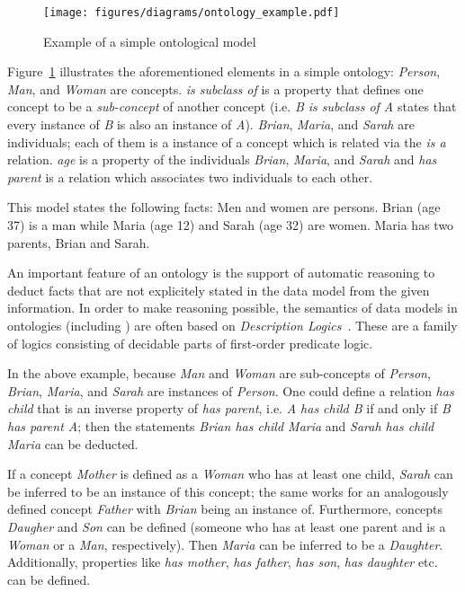 \vspace{1em}

\begin{figure}
\centering
\texttt{[image: figures/diagrams/ontology\_example.pdf]}
\caption{Example of a simple ontological model}
\label{fig:ontology_example}
\end{figure}

Figure~\ref{fig:ontology_example} illustrates the aforementioned elements in a simple ontology: \emph{Person}, \emph{Man}, and \emph{Woman} are concepts. \emph{is subclass of} is a property that defines one concept to be a \emph{sub-concept} of another concept (i.e. \emph{B is subclass of A} states that every instance of \emph{B} is also an instance of \emph{A}). \emph{Brian}, \emph{Maria}, and \emph{Sarah} are individuals; each of them is a instance of a concept which is related via the \emph{is a} relation. \emph{age} is a property of the individuals \emph{Brian}, \emph{Maria}, and \emph{Sarah} and \emph{has parent} is a relation which associates two individuals to each other.

This model states the following facts: Men and women are persons. Brian (age 37) is a man while Maria (age 12) and Sarah (age 32) are women. Maria has two parents, Brian and Sarah.

\vspace{1em}

An important feature of an ontology is the support of automatic reasoning to deduct facts that are not explicitely stated in the data model from the given information. In order to make reasoning possible, the semantics of data models in ontologies (including ) are often based on \emph{Description Logics}~\cite{OWL,SROIQ}. These are a family of logics consisting of decidable parts of first-order predicate logic.

In the above example, because \emph{Man} and \emph{Woman} are sub-concepts of \emph{Person}, \emph{Brian}, \emph{Maria}, and \emph{Sarah} are instances of \emph{Person}. One could define a relation \emph{has child} that is an inverse property of \emph{has parent}, i.e. \emph{A has child B} if and only if \emph{B has parent A}; then the statements \emph{Brian has child Maria} and \emph{Sarah has child Maria} can be deducted.

If a concept \emph{Mother} is defined as a \emph{Woman} who has at least one child, \emph{Sarah} can be inferred to be an instance of this concept; the same works for an analogously defined concept \emph{Father} with \emph{Brian} being an instance of. Furthermore, concepts \emph{Daugher} and \emph{Son} can be defined (someone who has at least one parent and is a \emph{Woman} or a \emph{Man}, respectively). Then \emph{Maria} can be inferred to be a \emph{Daughter}. Additionally, properties like \emph{has mother}, \emph{has father}, \emph{has son}, \emph{has daughter} etc. can be defined.

